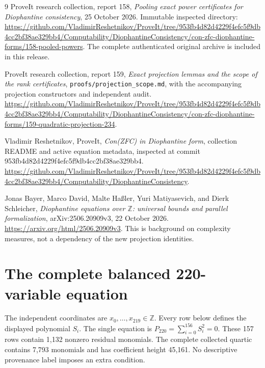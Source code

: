\documentclass[10pt,letterpaper]{article}
\theoremstyle{definition}\newtheorem{definition}[theorem]{Definition}
\newcommand{\Z}{\mathbb Z}\newcommand{\Q}{\mathbb Q}
\begin{document}
\begin{thebibliography}{9}
ProveIt research collection, report 158,
\emph{Pooling exact power certificates for Diophantine consistency},
25 October 2026. Immutable inspected directory:
\url{https://github.com/VladimirReshetnikov/ProveIt/tree/953fb4d82d4229f4efc5f9db4cc2bf38ae329bb4/Computability/DiophantineConsistency/con-zfc-diophantine-forms/158-pooled-powers}.
The complete authenticated original archive is included in this release.

ProveIt research collection, report 159,
\emph{Exact projection lemmas and the scope of the rank certificates},
\texttt{proofs/projection\_scope.md}, with the accompanying projection
constructors and independent audit.
\url{https://github.com/VladimirReshetnikov/ProveIt/tree/953fb4d82d4229f4efc5f9db4cc2bf38ae329bb4/Computability/DiophantineConsistency/con-zfc-diophantine-forms/159-quadratic-projection-234}.

Vladimir Reshetnikov, ProveIt,
\emph{Con(ZFC) in Diophantine form}, collection README and active equation
metadata, inspected at commit 953fb4d82d4229f4efc5f9db4cc2bf38ae329bb4.
\url{https://github.com/VladimirReshetnikov/ProveIt/tree/953fb4d82d4229f4efc5f9db4cc2bf38ae329bb4/Computability/DiophantineConsistency}.

Jonas Bayer, Marco David, Malte Ha\ss ler, Yuri Matiyasevich, and Dierk
Schleicher, \emph{Diophantine equations over $\mathbb Z$: universal bounds
and parallel formalization}, arXiv:2506.20909v3, 22 October 2026.
\url{https://arxiv.org/html/2506.20909v3}.
This is background on complexity measures, not a dependency of the new
projection identities.
\end{thebibliography}

\clearpage\appendix
\section{The complete balanced 220-variable equation}
\label{app:220}
The independent coordinates are $x_0,\ldots,x_{219}\in\Z$.
Every row below defines the displayed polynomial $S_i$.
The single equation is $P_{220}=\sum_{i=0}^{156}S_i^2=0$.
These 157 rows contain 1,132 nonzero residual monomials. The complete
collected quartic contains 7,793 monomials and has coefficient height
45,161. No descriptive provenance label imposes an extra condition.
\begingroup\small\setlength{\jot}{2pt}
\setlength{\abovedisplayskip}{5pt}\setlength{\belowdisplayskip}{5pt}
\allowdisplaybreaks[4]

\endgroup
\end{document}
